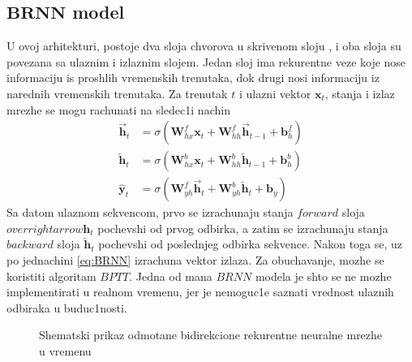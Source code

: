 \documentclass[a4paper, openany, oneside, 11pt]{book}
\begin{document}
\subsection[$BRNN$ model]{$\mathbf{BRNN}$ model}
U ovoj arhitekturi, postoje dva sloja chvorova u skrivenom sloju , i oba sloja su povezana sa ulaznim i izlaznim slojem. Jedan sloj ima rekurentne veze koje nose informaciju is proshlih vremenskih trenutaka, dok drugi nosi informaciju iz narednih vremenskih trenutaka. Za trenutak $t$ i ulazni vektor $\mathbf{x}_{t}$, stanja i izlaz mrezhe se mogu rachunati na sledec1i nachin
\begin{align}
\overrightarrow{\mathbf{h}}_t &= \sigma\left(\mathbf{W}^f_{hx}\mathbf{x}_t+\mathbf{W}^f_{hh}\overrightarrow{\mathbf{h}}_{t-1}+\mathbf{b}_h^f\right)\\
\overleftarrow{\mathbf{h}}_t &= \sigma\left(\mathbf{W}^b_{hx}\mathbf{x}_t+\mathbf{W}^b_{hh}\overleftarrow{\mathbf{h}}_{t-1}+\mathbf{b}_h^b\right)\\
\mathbf{\hat{y}}_t&= \sigma\left(\mathbf{W}^f_{yh}\overrightarrow{\mathbf{h}}_t +\mathbf{W}^b_{yh}\overleftarrow{\mathbf{h}}_t+\mathbf{b}_y\right) \label{eq:BRNN}
\end{align}
Sa datom ulaznom sekvencom, prvo se izrachunaju stanja $forward$ sloja $overrightarrow{\mathbf{h}}_t$ pochevshi od prvog odbirka, a zatim se izrachunaju stanja $backward$ sloja $\overleftarrow{\mathbf{h}}_t$ pochevshi od poslednjeg odbirka sekvence. Nakon toga se, uz po jednachini \ref{eq:BRNN} izrachuna vektor izlaza. Za obuchavanje, mozhe se koristiti algoritam $BPTT$. Jedna od mana $BRNN$ modela je shto se ne mozhe implementirati u realnom vremenu, jer je nemoguc1e saznati vrednost ulaznih odbiraka u buduc1nosti.
\newpage
\begin{figure}[!h]
\hspace*{0.2\linewidth}
\caption{Shemat\-ski prikaz odmotane bidirekcione rekurentne neuralne mre\-zhe u vremenu}
\label{fig:12}
\end{figure}
\end{document}
